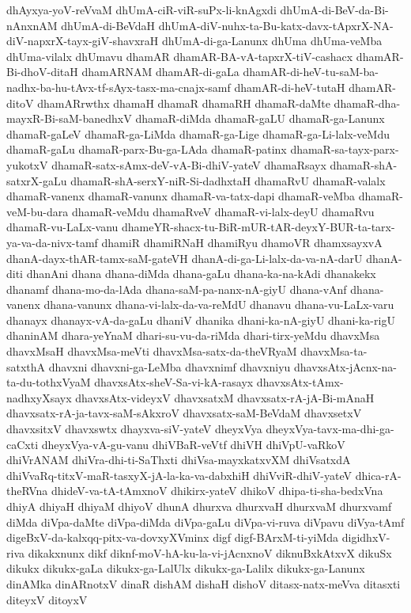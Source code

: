 {dhAyxya-yoV-reVvaM
dhUmA-ciR-viR-suPx-li-knAgxdi
dhUmA-di-BeV-da-Bi-nAnxnAM
dhUmA-di-BeVdaH
dhUmA-diV-nuhx-ta-Bu-katx-davx-tApxrX-NA-diV-napxrX-tayx-giV-shavxraH
dhUmA-di-ga-Lanunx
dhUma
dhUma-veMba
dhUma-vilalx
dhUmavu
dhamAR
dhamAR-BA-vA-tapxrX-tiV-cashacx
dhamAR-Bi-dhoV-ditaH
dhamARNAM
dhamAR-di-gaLa
dhamAR-di-heV-tu-saM-ba-nadhx-ba-hu-tAvx-tf-sAyx-tasx-ma-cnajx-samf
dhamAR-di-heV-tutaH
dhamAR-ditoV
dhamARrwthx
dhamaH
dhamaR
dhamaRH
dhamaR-daMte
dhamaR-dha-mayxR-Bi-saM-banedhxV
dhamaR-diMda
dhamaR-gaLU
dhamaR-ga-Lanunx
dhamaR-gaLeV
dhamaR-ga-LiMda
dhamaR-ga-Lige
dhamaR-ga-Li-lalx-veMdu
dhamaR-gaLu
dhamaR-parx-Bu-ga-LAda
dhamaR-patinx
dhamaR-sa-tayx-parx-yukotxV
dhamaR-satx-sAmx-deV-vA-Bi-dhiV-yateV
dhamaRsayx
dhamaR-shA-satxrX-gaLu
dhamaR-shA-serxY-niR-Si-dadhxtaH
dhamaRvU
dhamaR-valalx
dhamaR-vanenx
dhamaR-vanunx
dhamaR-va-tatx-dapi
dhamaR-veMba
dhamaR-veM-bu-dara
dhamaR-veMdu
dhamaRveV
dhamaR-vi-lalx-deyU
dhamaRvu
dhamaR-vu-LaLx-vanu
dhameYR-shacx-tu-BiR-mUR-tAR-deyxY-BUR-ta-tarx-ya-va-da-nivx-tamf
dhamiR
dhamiRNaH
dhamiRyu
dhamoVR
dhamxsayxvA
dhanA-dayx-thAR-tamx-saM-gateVH
dhanA-di-ga-Li-lalx-da-va-nA-darU
dhanA-diti
dhanAni
dhana
dhana-diMda
dhana-gaLu
dhana-ka-na-kAdi
dhanakekx
dhanamf
dhana-mo-da-lAda
dhana-saM-pa-nanx-nA-giyU
dhana-vAnf
dhana-vanenx
dhana-vanunx
dhana-vi-lalx-da-va-reMdU
dhanavu
dhana-vu-LaLx-varu
dhanayx
dhanayx-vA-da-gaLu
dhaniV
dhanika
dhani-ka-nA-giyU
dhani-ka-rigU
dhaninAM
dhara-yeYnaM
dhari-su-vu-da-riMda
dhari-tirx-yeMdu
dhavxMsa
dhavxMsaH
dhavxMsa-meVti
dhavxMsa-satx-da-theVRyaM
dhavxMsa-ta-satxthA
dhavxni
dhavxni-ga-LeMba
dhavxnimf
dhavxniyu
dhavxsAtx-jAcnx-na-ta-du-tothxVyaM
dhavxsAtx-sheV-Sa-vi-kA-rasayx
dhavxsAtx-tAmx-nadhxyXsayx
dhavxsAtx-videyxV
dhavxsatxM
dhavxsatx-rA-jA-Bi-mAnaH
dhavxsatx-rA-ja-tavx-saM-sAkxroV
dhavxsatx-saM-BeVdaM
dhavxsetxV
dhavxsitxV
dhavxswtx
dhayxva-siV-yateV
dheyxVya
dheyxVya-tavx-ma-dhi-ga-caCxti
dheyxVya-vA-gu-vanu
dhiVBaR-veVtf
dhiVH
dhiVpU-vaRkoV
dhiVrANAM
dhiVra-dhi-ti-SaThxti
dhiVsa-mayxkatxvXM
dhiVsatxdA
dhiVvaRq-titxV-maR-tasxyX-jA-la-ka-va-dabxhiH
dhiVviR-dhiV-yateV
dhica-rA-theRVna
dhideV-va-tA-tAmxnoV
dhikirx-yateV
dhikoV
dhipa-ti-sha-bedxVna
dhiyA
dhiyaH
dhiyaM
dhiyoV
dhunA
dhurxva
dhurxvaH
dhurxvaM
dhurxvamf
diMda
diVpa-daMte
diVpa-diMda
diVpa-gaLu
diVpa-vi-ruva
diVpavu
diVya-tAmf
digeBxV-da-kalxqq-pitx-va-dovxyXVminx
digf
digf-BArxM-ti-yiMda
digidhxV-riva
dikakxnunx
dikf
diknf-moV-hA-ku-la-vi-jAcnxnoV
diknuBxkAtxvX
dikuSx
dikukx
dikukx-gaLa
dikukx-ga-LalUlx
dikukx-ga-Lalilx
dikukx-ga-Lanunx
dinAMka
dinARnotxV
dinaR
dishAM
dishaH
dishoV
ditasx-natx-meVva
ditasxti
diteyxV
ditoyxV
}
